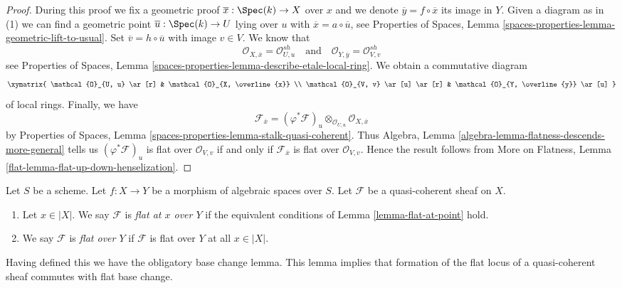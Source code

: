 \begin{proof}
During this proof we fix a geometric proof
$\overline{x} : \Spec(k) \to X$ over $x$ and
we denote $\overline{y} = f \circ \overline{x}$ its image in $Y$.
Given a diagram as in (1) we can find a geometric point
$\overline{u} : \Spec(k) \to U$ lying over $u$ with
$\overline{x} = a \circ \overline{u}$, see
Properties of Spaces, Lemma
\ref{spaces-properties-lemma-geometric-lift-to-usual}.
Set $\overline{v} = h \circ \overline{u}$ with image $v \in V$.
We know that
$$
\mathcal{O}_{X, \overline{x}} = \mathcal{O}_{U, u}^{sh}
\quad\text{and}\quad
\mathcal{O}_{Y, \overline{y}} = \mathcal{O}_{V, v}^{sh}
$$
see
Properties of Spaces, Lemma
\ref{spaces-properties-lemma-describe-etale-local-ring}.
We obtain a commutative diagram
$$
\xymatrix{
\mathcal{O}_{U, u} \ar[r] &
\mathcal{O}_{X, \overline{x}} \\
\mathcal{O}_{V, v} \ar[u] \ar[r] &
\mathcal{O}_{Y, \overline{y}} \ar[u]
}
$$
of local rings. Finally, we have
$$
\mathcal{F}_{\overline{x}} =
(\varphi^*\mathcal{F})_u \otimes_{\mathcal{O}_{U, u}}
\mathcal{O}_{X, \overline{x}}
$$
by
Properties of Spaces, Lemma \ref{spaces-properties-lemma-stalk-quasi-coherent}.
Thus
Algebra, Lemma \ref{algebra-lemma-flatness-descends-more-general}
tells us $(\varphi^*\mathcal{F})_u$ is flat over $\mathcal{O}_{V, v}$
if and only if $\mathcal{F}_{\overline{x}}$ is flat over $\mathcal{O}_{V, v}$.
Hence the result follows from
More on Flatness, Lemma \ref{flat-lemma-flat-up-down-henselization}.
\end{proof}

\begin{definition}
\label{definition-flat-module}
Let $S$ be a scheme.
Let $f : X \to Y$ be a morphism of algebraic spaces over $S$.
Let $\mathcal{F}$ be a quasi-coherent sheaf on $X$.
\begin{enumerate}
\item Let $x \in |X|$. We say $\mathcal{F}$ is {\it flat at $x$ over $Y$}
if the equivalent conditions of
Lemma \ref{lemma-flat-at-point}
hold.
\item We say $\mathcal{F}$ is {\it flat over $Y$} if $\mathcal{F}$ is
flat over $Y$ at all $x \in |X|$.
\end{enumerate}
\end{definition}

\noindent
Having defined this we have the obligatory base change lemma.
This lemma implies that formation of the flat locus of a quasi-coherent
sheaf commutes with flat base change.

